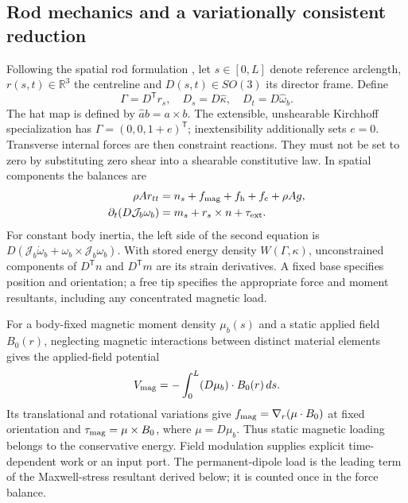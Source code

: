 
\subsection{Rod mechanics and a variationally consistent reduction}
Following the spatial rod formulation \citep{simo,antman}, let $s\in[0,L]$ denote reference arclength, $r(s,t)\in\mathbb R^3$
the centreline and $D(s,t)\in SO(3)$ its director frame. Define
\begin{equation}
 \Gamma=D^{\mathsf T}r_s,\quad
 D_s=D\widehat\kappa,\quad D_t=D\widehat\omega_b.
\end{equation}
The hat map is defined by $\widehat a b=a\times b$.
The extensible, unshearable Kirchhoff specialization has
$\Gamma=(0,0,1+e)^{\mathsf T}$; inextensibility additionally sets $e=0$.
Transverse internal forces are then constraint reactions. They must not
be set to zero by substituting zero shear into a shearable constitutive law.
In spatial components the balances are
\begin{align}
 \rho A r_{tt}&=n_s+f_{\rm mag}+f_{\rm h}+f_{\rm c}+\rho A g,\\
 \partial_t(D\mathcal J_b\omega_b)&=m_s+r_s\times n+\tau_{\rm ext}.
\end{align}
For constant body inertia, the left side of the second equation is
$D(\mathcal J_b\dot\omega_b+\omega_b\times\mathcal J_b\omega_b)$.
With stored energy density $W(\Gamma,\kappa)$, unconstrained components
of $D^{\mathsf T}n$ and $D^{\mathsf T}m$ are its strain derivatives.
A fixed base specifies position and orientation; a free tip specifies
the appropriate force and moment resultants, including any concentrated
magnetic load.

For a body-fixed magnetic moment density $\mu_b(s)$ and a static applied
field $B_0(r)$, neglecting magnetic interactions between distinct
material elements gives the applied-field potential
\begin{equation}
 V_{\rm mag}=-\int_0^L(D\mu_b)\cdot B_0(r)\,ds.
\end{equation}
Its translational and rotational variations give
$f_{\rm mag}=\nabla_r(\mu\cdot B_0)$ at fixed orientation and
$\tau_{\rm mag}=\mu\times B_0$, where $\mu=D\mu_b$.
Thus static magnetic loading belongs to the conservative energy.
Field modulation supplies explicit time-dependent work or an input port.
The permanent-dipole load is the leading term of the Maxwell-stress
resultant derived below; it is counted once in the force balance.

